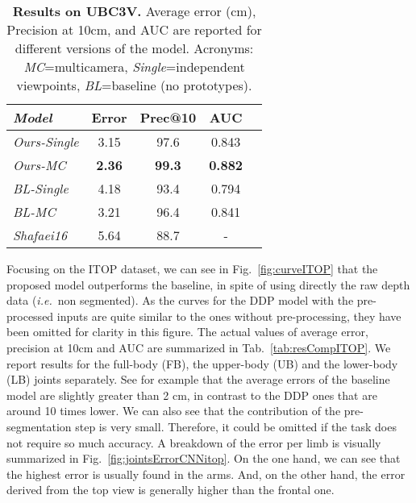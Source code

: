 \documentclass[review,12pt,3p]{elsarticle}
\def \ie{\textit{i.e.}}
\begin{document}
\begin{table}[tbh]
\caption{\textbf{Results on UBC3V.} Average error (cm), Precision at 10cm, and AUC are reported for different versions of the model. Acronyms: \textit{MC}=multicamera, \textit{Single}=independent viewpoints, \textit{BL}=baseline (no prototypes). 
}
\label{tab:resCompUBC3V}
\footnotesize
\begin{center}
\setlength{\tabcolsep}{0.2em} %
\begin{tabular}{|l|c|c|c|c|}
\hline 
\textit{Model} & Error & Prec@10 & AUC \\ 
\hline \hline
\textit{Ours-Single} &3.15 & 97.6 & 0.843\\
\textit{Ours-MC} &  \textbf{2.36} & \textbf{99.3} & \textbf{0.882}\\
\hline
\textit{BL-Single} & 4.18 & 93.4  & 0.794\\ %
\textit{BL-MC}  & 3.21 & 96.4 & 0.841\\ %
\hline
\textit{Shafaei16} & 5.64 & 88.7 & - \\
\hline 
\end{tabular} 
\end{center}
\end{table}

Focusing on the ITOP dataset, we can see in Fig.~\ref{fig:curveITOP} that the proposed model outperforms the baseline, in spite of using directly the raw depth data (\ie~non segmented). As the curves for the DDP model with the pre-processed inputs are quite similar to the ones without pre-processing, they have been omitted for clarity in this figure.
The actual values of average error, precision at 10cm and AUC are summarized in Tab.~\ref{tab:resCompITOP}. We report results for the full-body (FB), the upper-body (UB) and the lower-body (LB) joints separately.
See for example that the average errors of the baseline model are slightly greater than 2 cm, in contrast to the DDP ones that are around 10 times lower.
We can also see that the contribution of the pre-segmentation step is very small. Therefore, it could be omitted if the task does not require so much accuracy.
%
A breakdown of the error per limb is visually summarized in Fig.~\ref{fig:jointsErrorCNNitop}. On the one hand, we can see that the highest error is usually found in the arms. And, on the other hand, the error derived from the top view is generally higher than the frontal one.
\end{document}

